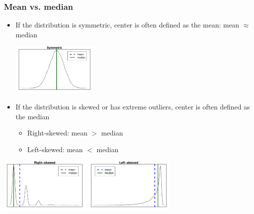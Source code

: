 \begin{frame}
\frametitle{Mean vs. median}

\begin{itemize}

\item If the distribution is symmetric, center is often defined as the mean: mean $\approx$ median

\begin{center}
\includegraphics[width=0.33\textwidth]{2-1_numerical_data/figures/mean_med/sym}
\end{center}

\item If the distribution is skewed or has extreme outliers, center is often defined as the median
\begin{itemize}
\item Right-skewed: mean $>$ median
\item Left-skewed: mean $<$ median \\
\end{itemize}

\end{itemize}

\begin{center}
\includegraphics[width=0.33\textwidth]{2-1_numerical_data/figures/mean_med/rs}
\includegraphics[width=0.33\textwidth]{2-1_numerical_data/figures/mean_med/ls}\\
\end{center}

\end{frame}


